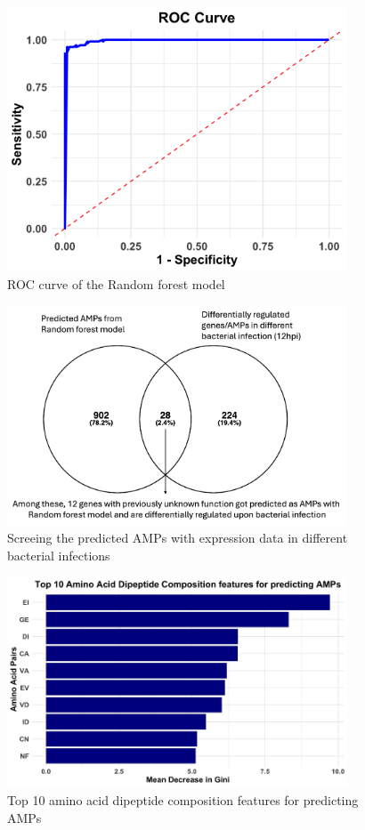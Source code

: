 \documentclass[letterpaper,11pt]{article}
\begin{document}
\begin{figure}[H]
    \centering
    \includegraphics[width=0.9\textwidth]{figures/Random_forest_ROC.png}
    \caption{ROC curve of the Random forest model}
    \label{fig:featureimportance}
\end{figure}

\begin{figure}[H]
    \centering
    \includegraphics[width=0.9\textwidth]{figures/venn.jpg}
    \caption{Screeing the predicted AMPs with expression data in different bacterial infections}
    \label{fig:featureimportance}
\end{figure}

\begin{figure}[H]
    \centering
    \includegraphics[width=0.9\textwidth]{figures/featureimportance.jpg}
    \caption{Top 10 amino acid dipeptide composition features for predicting AMPs}
    \label{fig:featureimportance}
\end{figure}

%
%
\end{document}
